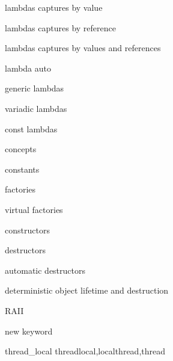          lambdas captures by value
        
         lambdas captures by reference 
        
         lambdas captures by values and references 
        
         lambda auto
        
         generic lambdas
        
         variadic lambdas 
        
         const lambdas 
        
         concepts 
        
         constants 
        
         factories 
        
         virtual factories 
        
         constructors 
        
         destructors
        
         automatic destructors 
        
         deterministic object lifetime and destruction
        
         RAII 
        
         new keyword 
        
         thread_local
        threadlocal,localthread,thread
        
